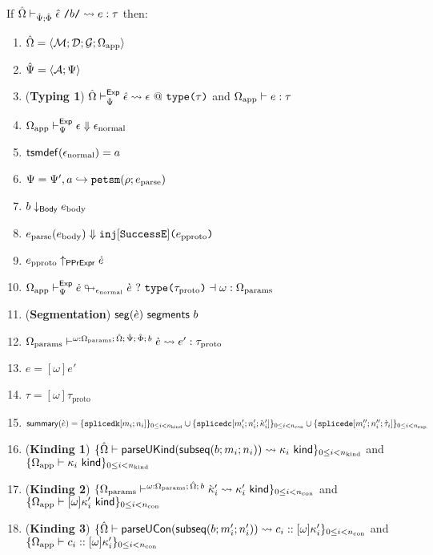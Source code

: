 \begingroup
\def\thetheorem{\ref{thm:petsm-abstract-reasoning-principles}}
\begin{theorem}
If ${\hat\Omega} \vdash_{\hat{\Psi}; \hat\Phi} {\hat\epsilon}~\texttt{/}b\texttt{/} \leadsto e : \tau$ then:
\begin{enumerate}
	\item ${\hat\Omega}=\langle \mathcal{M}; \mathcal{D}; \mathcal{G}; \Omega_\text{app} \rangle$
	\item $\hat{\Psi}=\langle \mathcal{A}; \Psi \rangle$
	\item (\textbf{Typing 1}) ${\hat\Omega} \vdash_{\hat{\Psi}}^{\mathsf{Exp}} {\hat\epsilon} \leadsto \epsilon~@~\texttt{type}\texttt{(}\tau\texttt{)}$ and $\Omega_\text{app} \vdash e : \tau$
	\item $\Omega_\text{app} \vdash_{\Psi}^\mathsf{Exp} \epsilon \Downarrow \epsilon_\text{normal}$
	\item $\mathsf{tsmdef}(\epsilon_\text{normal})=a$
	\item $\Psi = \Psi', a \hookrightarrow \texttt{petsm}(\rho; e_\text{parse})$
	\item $b \downarrow_\mathsf{Body} e_\text{body}$
  	\item $e_\text{parse}(e_\text{body}) \Downarrow \texttt{inj}[\mathtt{SuccessE}]\texttt{(}e_\text{pproto}\texttt{)}$
	\item $e_\text{pproto} \uparrow_\mathsf{PPrExpr} \dot{e}$
	\item $\Omega_\text{app} \vdash_{\Psi}^\mathsf{Exp} \dot{e} \looparrowright_{\epsilon_\text{normal}} \grave{e} ~?~ \texttt{type}\texttt{(}\tau_\text{proto}\texttt{)} \dashv \omega : \Omega_\text{params}$
	\item (\textbf{Segmentation}) $\mathsf{seg}(\grave{e})~\mathsf{segments}~b$
	\item $\Omega_\text{params} \vdash^{\omega : \Omega_\text{params};\,{\hat\Omega};\,\hat{\Psi};\,\hat\Phi;\,b} \grave{e} \leadsto e' : \tau_\text{proto}$
	\item $e = [\omega]e'$
	\item $\tau = [\omega]\tau_\text{proto}$
	\item $
		\mathsf{summary}(\grave{e}) = \{\texttt{splicedk}[m_i; n_i]\}_{0 \leq i < n_\text{kind}} \cup \{\texttt{splicedc}[m'_i; n'_i; {\grave\kappa}'_i]\}_{0 \leq i < n_\text{con}} \cup\\
					     \{\texttt{splicede}[m''_i; n''_i; \grave{\tau}_i]\}_{0 \leq i < n_\text{exp}}
		$
	\item (\textbf{Kinding 1}) $\{{\hat\Omega} \vdash \mathsf{parseUKind}(\mathsf{subseq}(b; m_i; n_i)) \leadsto \kappa_i~\mathsf{kind}\}_{0 \leq i < n_\text{kind}}$ and $\{\Omega_\text{app} \vdash \kappa_i~\mathsf{kind}\}_{0 \leq i < n_\text{kind}}$
	\item (\textbf{Kinding 2}) $\{\Omega_\text{params} \vdash^{\omega : \Omega_\text{params};\,{\hat\Omega};\,b} {\grave\kappa}'_i \leadsto \kappa'_i~\mathsf{kind}\}_{0 \leq i < n_\text{con}}$ and $\{\Omega_\text{app} \vdash [\omega]\kappa'_i~\mathsf{kind}\}_{0 \leq i < n_\text{con}}$
	\item (\textbf{Kinding 3}) $\{{\hat\Omega} \vdash \mathsf{parseUCon}(\mathsf{subseq}(b; m'_i; n'_i)) \leadsto c_i :: [\omega]\kappa'_i\}_{0 \leq i < n_\text{con}}$ and $\{\Omega_\text{app} \vdash c_i :: [\omega]\kappa'_i\}_{0 \leq i < n_\text{con}}$

\end{enumerate}
\end{theorem}
